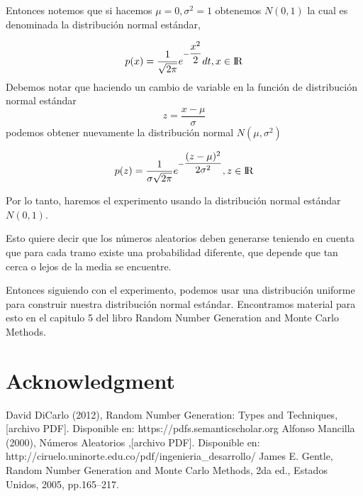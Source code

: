 \documentclass[conference,a4paper]{IEEEtran}
\begin{document}
Entonces notemos que si hacemos $\mu=0,\sigma^2=1$ obtenemos $N(0,1)$
la cual es denominada la distribuci\'on normal est\'andar, 
 
$$p(x) = \dfrac {1}{\sqrt{2\pi}}
e^{-\dfrac{x^2}{2}} dt, x \in {\rm I\!R} $$
Debemos notar que haciendo un cambio de variable en la funci\'on de distribuci\'on normal est\'andar $$z=\dfrac{x-\mu}{\sigma}$$ podemos obtener nuevamente la distribuci\'on normal $N(\mu,\sigma^2)$ 

$$p(z) = \dfrac {1}{\sigma\sqrt{2\pi}}
e^{-\dfrac{(z-\mu)^2}{2\sigma^2}} , z \in {\rm I\!R} $$

Por lo tanto, haremos el experimento usando la distribuci\'on normal est\'andar $N(0,1)$.

Esto quiere decir que los n\'umeros aleatorios deben generarse teniendo en cuenta que para cada tramo existe una probabilidad diferente, que depende que tan cerca o lejos de la media se encuentre.

Entonces siguiendo con el experimento, podemos usar una distribuci\'on uniforme para construir nuestra distribuci\'on normal est\'andar. Encontramos material para esto en el capitulo 5 del libro Random Number Generation and Monte Carlo Methods\cite{b3}.

\section*{Acknowledgment}



\begin{thebibliography}{0}
 David DiCarlo (2012), Random Number Generation: Types and Techniques, [archivo PDF]. Disponible en: https://pdfs.semanticscholar.org
 Alfonso Mancilla (2000), N\'umeros Aleatorios ,[archivo PDF]. Disponible en: http://ciruelo.uninorte.edu.co/pdf/ingenieria\_desarrollo/
 James E. Gentle, Random Number Generation and Monte Carlo Methods, 2da ed., Estados Unidos, 2005, pp.165--217.

\end{thebibliography}
\vspace{12pt}
\end{document}
